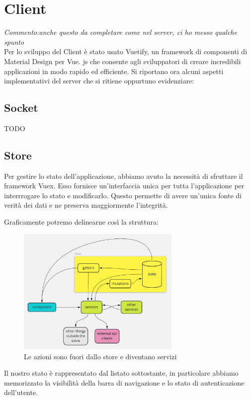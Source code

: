 \section{Client}
\textit{Commento:anche questo da completare come nel server, ci ho messo qualche spunto}\\
Per lo sviluppo del Client è stato usato Vuetify, un framework di componenti di Material Design per Vue. js che consente agli sviluppatori di creare incredibili applicazioni in modo rapido ed efficiente.
Si riportano ora alcuni aspetti implementativi del server che si ritiene oppurtuno evidenziare: 
\subsection{Socket}
TODO

\subsection{Store}
Per gestire lo stato dell'applicazione, abbiamo avuto la necessità di sfruttare il framework Vuex. Esso fornisce un'interfaccia unica per tutta l'applicazione per interrrogare lo stato e modificarlo. Questo permette di avere un'unica fonte di verità dei dati e ne preserva maggiormente l'integrità.

Graficamente potremo delinearne così la struttura:
\begin{figure}[H]
    \caption{Le azioni sono fuori dallo store e diventano servizi}
    \label{fig:Store}
    \centering
    \includegraphics[width=0.7\textwidth]{Images/store.png}
\end{figure}

Il nostro stato è rappresentato dal listato sottostante, in particolare abbiamo memorizzato la visibilità della barra di navigazione e lo stato di autenticazione dell'utente.

